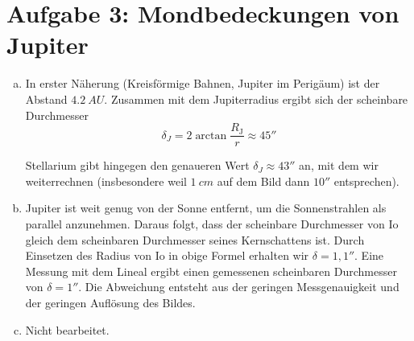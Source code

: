 \documentclass[a4paper,german,12pt,smallheadings]{scrartcl}
\begin{document}
\section*{Aufgabe 3: Mondbedeckungen von Jupiter}
\begin{enumerate}[a)]
  \item
    In erster Näherung (Kreisförmige Bahnen, Jupiter im Perigäum) ist der
    Abstand $\SI{4.2}{AU}$. Zusammen mit dem Jupiterradius ergibt sich der
    scheinbare Durchmesser
    \begin{equation}
      \delta_J = 2 \arctan \frac{R_\text{J}}{r} \approx 45''
    \end{equation}

    Stellarium gibt hingegen den genaueren Wert $\delta_J \approx 43''$ an,
    mit dem wir weiterrechnen (insbesondere weil $\SI{1}{cm}$ auf dem Bild dann
    $10''$ entsprechen).
  \item
    Jupiter ist weit genug von der Sonne entfernt, um die Sonnenstrahlen als
    parallel anzunehmen. Daraus folgt, dass der scheinbare Durchmesser von Io
    gleich dem scheinbaren Durchmesser seines Kernschattens ist. Durch
    Einsetzen des Radius von Io in obige Formel erhalten wir $\delta = 1{,}1''$. Eine
    Messung mit dem Lineal ergibt einen gemessenen scheinbaren Durchmesser von
    $\delta = 1''$. Die Abweichung entsteht aus der geringen Messgenauigkeit
    und der geringen Auflösung des Bildes.
  \item
    Nicht bearbeitet.

\end{enumerate}
\end{document}
